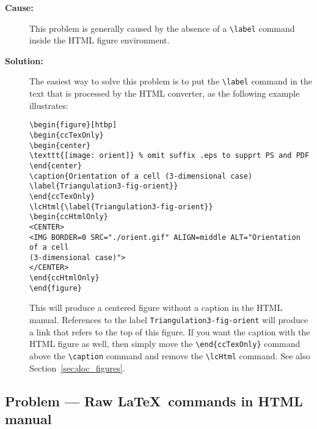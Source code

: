 
\begin{description}
\item[{\bf Cause:}] This problem is generally caused by the absence of a
     \verb|\label| command inside the HTML figure environment.

\item[{\bf Solution:}]
The easiest way to solve this problem is to put the
\verb|\label| command in the text that is processed by the HTML converter,
as the following example illustrates:

\begin{verbatim}
\begin{figure}[htbp]
\begin{ccTexOnly}
\begin{center}
\texttt{[image: orient]} % omit suffix .eps to supprt PS and PDF
\end{center}
\caption{Orientation of a cell (3-dimensional case)
\label{Triangulation3-fig-orient}}
\end{ccTexOnly}
\lcHtml{\label{Triangulation3-fig-orient}}
\begin{ccHtmlOnly}
<CENTER>
<IMG BORDER=0 SRC="./orient.gif" ALIGN=middle ALT="Orientation of a cell
(3-dimensional case)">
</CENTER>
\end{ccHtmlOnly}
\end{figure}
\end{verbatim}

This will produce a centered figure without a caption in the HTML manual.
References to the label {\tt Triangulation3-fig-orient} will produce a
link that refers to the top of this figure.  If you want the caption with
the HTML figure as well, then simply move the \verb|\end{ccTexOnly}|
command above the \verb|\caption| command and remove the \verb|\lcHtml|
command. See also Section~\ref{sec:doc_figures}.

\end{description}

\subsection*{Problem --- Raw \LaTeX\ commands in HTML manual}

